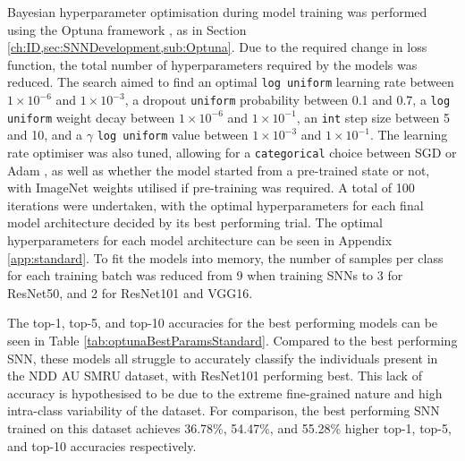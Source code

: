 Bayesian hyperparameter optimisation during model training was performed using the Optuna framework \cite{akiba_optuna_2019}, as in Section \ref{ch:ID,sec:SNNDevelopment,sub:Optuna}. Due to the required change in loss function, the total number of hyperparameters required by the models was reduced. The search aimed to find an optimal \texttt{log uniform} learning rate between $1\times10^{-6}$ and $1\times10^{-3}$, a dropout \cite{srivastava_dropout:_2014} \texttt{uniform} probability between 0.1 and 0.7, a \texttt{log uniform} weight decay between $1\times10^{-6}$ and $1\times10^{-1}$, an \texttt{int} step size between 5 and 10, and a $\gamma$ \texttt{log uniform} value between $1\times10^{-3}$ and $1\times10^{-1}$. The learning rate optimiser was also tuned, allowing for a \texttt{categorical} choice between SGD or Adam \cite{kingma_adam:_2014}, as well as whether the model started from a pre-trained state or not, with ImageNet \cite{krizhevsky_learning_2009} weights utilised if pre-training was required. A total of 100 iterations were undertaken, with the optimal hyperparameters for each final model architecture decided by its best performing trial. The optimal hyperparameters for each model architecture can be seen in Appendix \ref{app:standard}. To fit the models into memory, the number of samples per class for each training batch was reduced from 9 when training SNNs to 3 for ResNet50, and 2 for ResNet101 and VGG16.

The top-1, top-5, and top-10 accuracies for the best performing models can be seen in Table \ref{tab:optunaBestParamsStandard}. Compared to the best performing SNN, these models all struggle to accurately classify the individuals present in the NDD AU SMRU dataset, with ResNet101 performing best. This lack of accuracy is hypothesised to be due to the extreme fine-grained nature and high intra-class variability of the dataset. For comparison, the best performing SNN trained on this dataset achieves 36.78\%, 54.47\%, and 55.28\% higher top-1, top-5, and top-10 accuracies respectively. 

